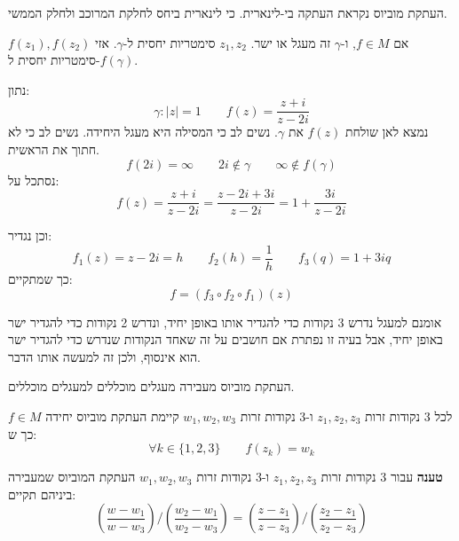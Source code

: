 \documentclass{tstextbook}
\begin{document}
\begin{remark}
העתקת מוביוס נקראת העתקה בי-לינארית. כי לינארית ביחס לחלקת המרוכב ולחלק הממשי.

\end{remark}
\begin{proposition}
אם \(f \in M\), ו-\(\gamma\) זה מעגל או ישר. \(z_{1},z_{2}\) סימטריות יחסית ל-\(\gamma\). אזי \(f(z_{1}),f(z_{2})\) סימטריות יחסית ל-\(f\left( \gamma \right)\).

\end{proposition}
\begin{example}
נתון:
$$\gamma:\lvert z \rvert=1\qquad f(z)= \frac{z+i}{z-2i}$$
נמצא לאן שולחת \(f(z)\) את \(\gamma\). נשים לב כי המסילה היא מעגל היחידה. נשים לב כי לא חתוך את הראשית.
$$f(2i)=\infty \qquad 2i \not \in \gamma \qquad \infty \not \in f\left( \gamma \right)$$
נסתכל על:
$$f(z)=\frac{z+i}{z-2i}=\frac{z-2i+3i}{z-2i}=1+\frac{3i}{z-2i}$$

\end{example}
וכן נגדיר:
$$f_{1}(z)=z-2i=h\qquad f_{2}(h)=\frac{1}{h}\qquad f_{3}(q)=1+3iq$$
כך שמתקיים:
$$f=\left( f_{3}\circ f_{2}\circ f_{1} \right)(z)$$

\begin{remark}
אומנם למעגל נדרש 3 נקודות כדי להגדיר אותו באופן יחיד, ונדרש 2 נקודות כדי להגדיר ישר באופן יחיד, אבל בעיה זו נפתרת אם חושבים על זה שאחד הנקודות שנדרש כדי להגדיר ישר הוא אינסוף, ולכן זה למעשה אותו הדבר.

\end{remark}
\begin{proposition}
העתקת מוביוס מעבירה מעגלים מוכללים למעגלים מוכללים.

\end{proposition}
\begin{proposition}
לכל 3 נקודות זרות \(z_{1},z_{2},z_{3}\) ו-3 נקודות זרות \(w_{1},w_{2},w_{3}\) קיימת העתקת מוביוס יחידה \(f \in M\) כך ש:
$$\forall k \in \{ 1,2,3 \}\qquad f(z_{k})=w_{k}$$

\end{proposition}
\textbf{טענה}
עבור 3 נקודות זרות \(z_{1},z_{2},z_{3}\) ו-3 נקודות זרות \(w_{1},w_{2},w_{3}\) העתקת המוביוס שמעבירה ביניהם תקיים:
$$\left( \frac{w-w_{1}}{w-w_{3}}  \right)/  \left( \frac{w_{2} - w_{1}}{w_{2}-w_{3}} \right) = \left( \frac{z - z_{1}}{z-z_{3}} \right) / \left( \frac{z_{2} - z_{1}}{z_{2}-z_{3}} \right)$$
\end{document}
